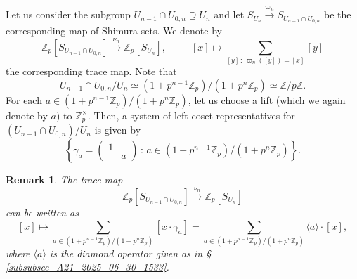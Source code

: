 \documentclass{amsart}
\numberwithin{equation}{section}
\newtheorem{remark}[theorem]{Remark}
\newcommand{\ZZ}{\mathbb{Z}}
\begin{document}
\subsubsection{} Let us consider the subgroup $U_{n-1}\cap U_{0,n} \supseteq U_n$ and let  $S_{U_n} \xrightarrow{\varpi_{n}} S_{U_{n-1}\cap U_{0,n}}$ be the corresponding map of Shimura sets. We denote by 
$$ \ZZ_p[S_{U_{n-1}\cap U_{0,n} }] \xrightarrow{\nu_{n}} \ZZ_p[S_{U_n}], \,\,\,\qquad [x] \mapsto \sum_{[y]\, :\, \varpi_{n}([y]) =[x] }[y]$$ 
the corresponding trace map. Note that 
$$U_{n-1}\cap U_{0,n}  / U_n \simeq  (1 + p^{n-1}\ZZ_p ) /  (1 + p^{n}\ZZ_p )\simeq \ZZ/p\ZZ.$$  
For each  $a \in (1 + p^{n-1}\ZZ_p ) /  (1 + p^{n}\ZZ_p )$, let us choose a lift (which we again denote by $a$) to $\ZZ_p^\times$. Then, a system of left coset representatives for $\left(U_{n-1}\cap U_{0,n} \right) / U_n $ is given by $$\left \{ \gamma_a =\left( \begin{smallmatrix}
    1 & \\ & a
\end{smallmatrix} \right)\,:\, a \in (1+p^{n-1}\ZZ_p)/(1+p^n \ZZ_p) \right\}.$$
\begin{remark}\label{rmk_trace_Hida}
    The trace map 
$$\ZZ_p[S_{U_{n-1}\cap U_{0,n} }] \xrightarrow{\nu_{n}} \ZZ_p[S_{U_n}]$$ can be written as 
$$[x] \mapsto \sum_{a \in (1+p^{n-1}\ZZ_p)/(1+p^n \ZZ_p)} [x \cdot \gamma_a] = \sum_{a \in (1+p^{n-1}\ZZ_p)/(1+p^n \ZZ_p)} \langle a \rangle \cdot [x],$$
where $\langle a \rangle$ is the diamond operator given as in \S
\ref{subsubsec_A21_2025_06_30_1533}. 
\end{remark}
\end{document}
